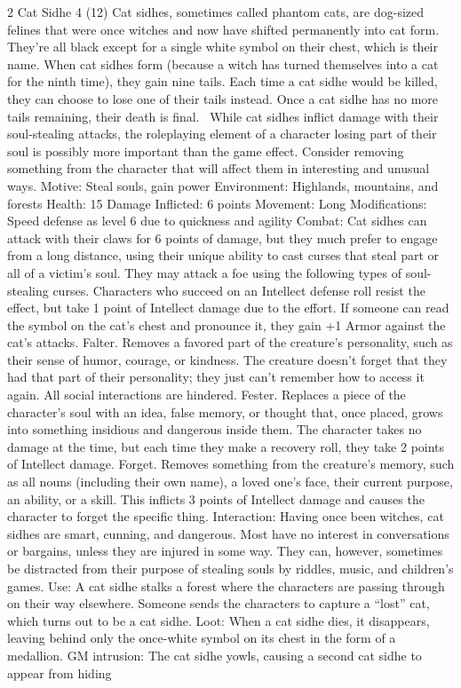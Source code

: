 \begin{multicols}{2}
Cat Sidhe 4 (12)
Cat sidhes, sometimes called phantom cats, are dog-sized felines that were once witches and now have shifted permanently into cat form. They’re all black except for a single white symbol on their chest, which is their name.
When cat sidhes form (because a witch has turned themselves into a cat for the ninth time), they gain nine tails. Each time a cat sidhe would be killed, they can choose to lose one of their tails instead. Once a cat sidhe has no more tails remaining, their death is final. 
	While cat sidhes inflict damage with their soul-stealing attacks, the roleplaying element of a character losing part of their soul is possibly more important than the game effect. Consider removing something from the character that will affect them in interesting and unusual ways.
Motive: Steal souls, gain power
Environment: Highlands, mountains, and forests
Health: 15
Damage Inflicted: 6 points
Movement: Long
Modifications: Speed defense as level 6 due to quickness and agility
Combat: Cat sidhes can attack with their claws for 6 points of damage, but they much
prefer to engage from a long distance, using their unique ability to cast curses that steal part or all of a victim’s soul. They may attack a foe using the following types of soul-stealing curses. Characters who succeed on an Intellect defense roll resist the effect, but take 1 point of Intellect damage due to the effort. If someone can read the symbol on the cat’s chest and pronounce it, they gain +1 Armor against the cat’s attacks.
Falter. Removes a favored part of the creature’s personality, such as their sense of humor, courage, or kindness. The creature doesn’t forget that they had that part of their personality; they just can’t remember how to access it again. All social interactions are hindered.
Fester. Replaces a piece of the character’s soul with an idea, false memory, or thought that, once placed, grows into something insidious and dangerous inside them. The character takes no damage at the time, but each time they make a recovery roll, they take 2 points of Intellect damage.
Forget. Removes something from the creature’s memory, such as all nouns (including their own name), a loved one’s face, their current purpose, an ability, or a skill. This inflicts 3 points of Intellect damage and causes the character to forget the specific thing.
Interaction: Having once been witches, cat sidhes are smart, cunning, and dangerous. Most have no interest in conversations or bargains, unless they are injured in some way. They
can, however, sometimes be distracted from their purpose of stealing souls by riddles, music, and children’s games.
Use: A cat sidhe stalks a forest where the characters are passing through on their way elsewhere. Someone sends the characters to capture a “lost” cat, which turns out to be a cat sidhe.
Loot: When a cat sidhe dies, it disappears, leaving behind only the once-white symbol on its chest in the form of a medallion.
GM intrusion: The cat sidhe yowls, causing a second cat sidhe to appear from hiding


\end{multicols}
